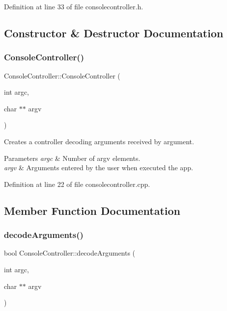 Definition at line 33 of file consolecontroller.\+h.



\subsection{Constructor \& Destructor Documentation}
\mbox{\label{classConsoleController_aaf8a775d3f675bcf9e7facd959217fdc}} 
\subsubsection{\texorpdfstring{Console\+Controller()}{ConsoleController()}}
{\footnotesize\ttfamily Console\+Controller\+::\+Console\+Controller (\begin{DoxyParamCaption}\item[{int}]{argc,  }\item[{char $\ast$$\ast$}]{argv }\end{DoxyParamCaption})}



Creates a controller decoding arguments received by argument. 


\begin{DoxyParams}{Parameters}
{\em argc} & Number of argv elements. \\
\hline
{\em argv} & Arguments entered by the user when executed the app. \\
\hline
\end{DoxyParams}


Definition at line 22 of file consolecontroller.\+cpp.



\subsection{Member Function Documentation}
\mbox{\label{classConsoleController_ab9fdcba75eecb1f28c1fcd3b97183fe8}} 
\subsubsection{\texorpdfstring{decode\+Arguments()}{decodeArguments()}}
{\footnotesize\ttfamily bool Console\+Controller\+::decode\+Arguments (\begin{DoxyParamCaption}\item[{int}]{argc,  }\item[{char $\ast$$\ast$}]{argv }\end{DoxyParamCaption})}



